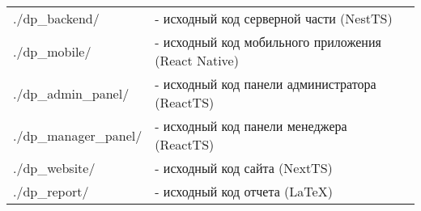 

\newpage
{}
\tableofcontents
\noindent
\begin{tabular}{p{5cm}p{12cm}}
    ./dp\_backend/          & - исходный код серверной части (NestTS) \\
    ./dp\_mobile/           & - исходный код мобильного приложения (React Native) \\
    ./dp\_admin\_panel/     & - исходный код панели администратора (ReactTS) \\
    ./dp\_manager\_panel/   & - исходный код панели менеджера (ReactTS) \\
    ./dp\_website/          & - исходный код сайта (NextTS) \\
    ./dp\_report/           & - исходный код отчета (LaTeX) \\
\end{tabular}


\newpage
{}
\thispagestyle{plain}
\pagestyle{plain}
